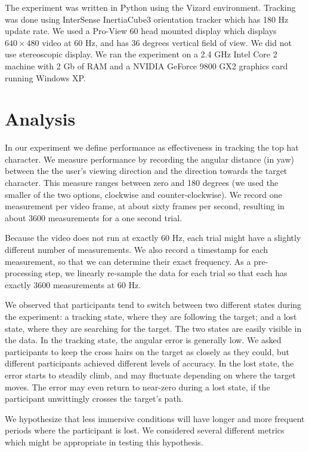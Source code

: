 \documentclass{acmsiggraph}                     %
\begin{document}
The experiment was written in Python using the Vizard environment.  Tracking was done using InterSense InertiaCube3 orientation tracker which has 180 Hz update rate.  We used a Pro-View 60 head mounted display which displays $640\times480$ video at 60 Hz, and has 36 degrees vertical field of view.  We did not use stereoscopic display.  We ran the experiment on a 2.4 GHz Intel Core 2 machine with 2 Gb of RAM and a NVIDIA GeForce 9800 GX2 graphics card running Windows XP.

\section{Analysis}

In our experiment we define performance as effectiveness in tracking the top hat character.  We measure performance by recording the angular distance (in yaw) between the the user's viewing direction and the direction towards the target character.  This measure ranges between zero and 180 degrees (we used the smaller of the two options, clockwise and counter-clockwise).  We record one measurement per video frame, at about sixty frames per second, resulting in about 3600 measurements for a one second trial.

Because the video does not run at exactly 60 Hz, each trial might have a slightly different number of measurements.  We also record a timestamp for each measurement, so that we can determine their exact frequency.  As a pre-processing step, we linearly re-sample the data for each trial so that each has exactly 3600 measurements at 60 Hz.

We observed that participants tend to switch between two different states during the experiment: a tracking state, where they are following the target; and a lost state, where they are searching for the target.  The two states are easily visible in the data.  In the tracking state, the angular error is generally low.  We asked participants to keep the cross hairs on the target as closely as they could, but different participants achieved different levels of accuracy.  In the lost state, the error starts to steadily climb, and may fluctuate depending on where the target moves.  The error may even return to near-zero during a lost state, if the participant unwittingly crosses the target's path.

We hypothesize that less immersive conditions will have longer and more frequent periods where the participant is lost.  We considered several different metrics which might be appropriate in testing this hypothesis.
\end{document}

